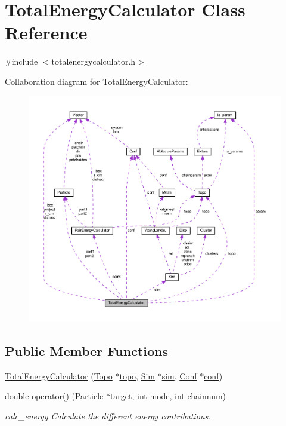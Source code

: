 \hypertarget{class_total_energy_calculator}{\section{Total\+Energy\+Calculator Class Reference}
\label{class_total_energy_calculator}
}


{\ttfamily \#include $<$totalenergycalculator.\+h$>$}



Collaboration diagram for Total\+Energy\+Calculator\+:\nopagebreak
\begin{figure}[H]
\begin{center}
\leavevmode
\includegraphics[width=350pt]{class_total_energy_calculator__coll__graph}
\end{center}
\end{figure}
\subsection*{Public Member Functions}
\begin{DoxyCompactItemize}
\item 
\hyperlink{class_total_energy_calculator_a0cb93271cde50b1c5141d13b8b57cf5e}{Total\+Energy\+Calculator} (\hyperlink{class_topo}{Topo} $\ast$\hyperlink{class_total_energy_calculator_aed85fe4b47789143751a8da4f533e615}{topo}, \hyperlink{class_sim}{Sim} $\ast$\hyperlink{class_total_energy_calculator_abc83a6fe12e76bdbff49d40667819edc}{sim}, \hyperlink{class_conf}{Conf} $\ast$\hyperlink{class_total_energy_calculator_ae868ad495fea34a95ccbee693e9ef9ae}{conf})
\item 
double \hyperlink{class_total_energy_calculator_a8cf80da65e373aac898e7254f900f6fe}{operator()} (\hyperlink{class_particle}{Particle} $\ast$target, int mode, int chainnum)
\begin{DoxyCompactList}\small\item\em calc\+\_\+energy Calculate the different energy contributions. \end{DoxyCompactList}\end{DoxyCompactItemize}

